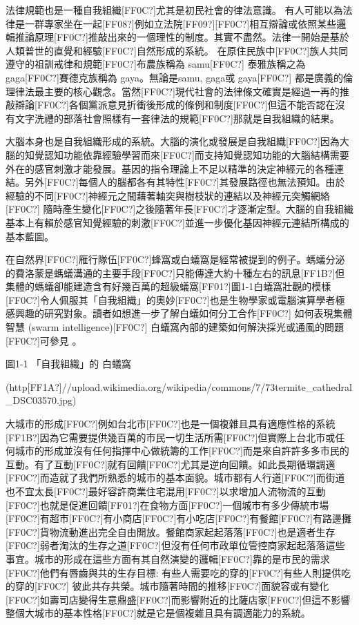 法律規範也是一種自我組織[FF0C?]尤其是初民社會的律法意識。 有人可能以為法律是一群專家坐在一起[FF08?]例如立法院[FF09?][FF0C?]相互辯論或依照某些邏輯推論原理[FF0C?]推敲出來的一個理性的制度。其實不盡然。法律一開始是基於人類普世的直覺和經驗[FF0C?]自然形成的系統。 在原住民族中[FF0C?]族人共同遵守的祖訓戒律和規範[FF0C?]布農族稱為 samu[FF0C?] 泰雅族稱之為gaga[FF0C?]賽德克族稱為 gaya。無論是samu, gaga或 gaya[FF0C?] 都是廣義的倫理律法最主要的核心觀念。當然[FF0C?]現代社會的法律條文確實是經過一再的推敲辯論[FF0C?]各個黨派意見折衝後形成的條例和制度[FF0C?]但這不能否認在沒有文字洗禮的部落社會照樣有一套律法的規範[FF0C?]那就是自我組織的結果。  

大腦本身也是自我組織形成的系統。大腦的演化或發展是自我組織[FF0C?]因為大腦的知覺認知功能依靠經驗學習而來[FF0C?]而支持知覺認知功能的大腦結構需要外在的感官刺激才能發展。基因的指令理論上不足以精準的決定神經元的各種連結。另外[FF0C?]每個人的腦都各有其特性[FF0C?]其發展路徑也無法預知。由於經驗的不同[FF0C?]神經元之間藉著軸突與樹枝狀的連結以及神經元突觸網絡[FF0C?] 隨時產生變化[FF0C?]之後隨著年長[FF0C?]才逐漸定型。大腦的自我組織基本上有賴於感官知覺經驗的刺激[FF0C?]並進一步優化基因神經元連結所構成的基本藍圖。

在自然界[FF0C?]雁行隊伍[FF0C?]蜂窩或白蟻窩是經常被提到的例子。螞蟻分泌的費洛蒙是螞蟻溝通的主要手段[FF0C?]只能傳達大約十種左右的訊息[FF1B?]但集體的螞蟻卻能建造含有好幾百萬的超級蟻窩[FF01?]圖1-1白蟻窩壯觀的模樣[FF0C?]令人佩服其「自我組織」的奧妙[FF0C?]也是生物學家或電腦演算學者極感興趣的研究對象。讀者如想進一步了解白蟻如何分工合作[FF0C?] 如何表現集體智慧 (swarm intelligence)[FF0C?] 白蟻窩內部的建築如何解決採光或通風的問題[FF0C?]可參見 \parencite{Margonelli2012}。




圖1-1 「自我組織」的 白蟻窩

(http[FF1A?]//upload.wikimedia.org/wikipedia/commons/7/73termite\_cathedral\_DSC03570.jpg)

大城市的形成[FF0C?]例如台北市[FF0C?]也是一個複雜且具有適應性格的系統[FF1B?]因為它需要提供幾百萬的市民一切生活所需[FF0C?]但實際上台北市或任何城市的形成並沒有任何指揮中心做統籌的工作[FF0C?]而是來自許許多多市民的互動。有了互動[FF0C?]就有回饋[FF0C?]尤其是逆向回饋。如此長期循環調適[FF0C?]而造就了我們所熟悉的城市的基本面貌。城市都有人行道[FF0C?]而街道也不宜太長[FF0C?]最好容許商業住宅混用[FF0C?]以求增加人流物流的互動[FF0C?]也就是促進回饋[FF01?]在食物方面[FF0C?]一個城市有多少傳統市場[FF0C?]有超市[FF0C?]有小商店[FF0C?]有小吃店[FF0C?]有餐館[FF0C?]有路邊攤[FF0C?]貨物流動進出完全自由開放。餐館商家起起落落[FF0C?]也是適者生存[FF0C?]弱者淘汰的生存之道[FF0C?]但沒有任何市政單位管控商家起起落落這些事宜。城市的形成在這些方面有其自然演變的邏輯[FF0C?]靠的是市民的需求[FF0C?]他們有唇齒與共的生存目標: 有些人需要吃的穿的[FF0C?]有些人則提供吃的穿的[FF0C?] 彼此共存共榮。城市隨著時間的推移[FF0C?]面貌容或有變化[FF0C?]如壽司店變得生意鼎盛[FF0C?]而影響附近的比薩店家[FF0C?]但這不影響整個大城市的基本性格[FF0C?]就是它是個複雜且具有調適能力的系統。

